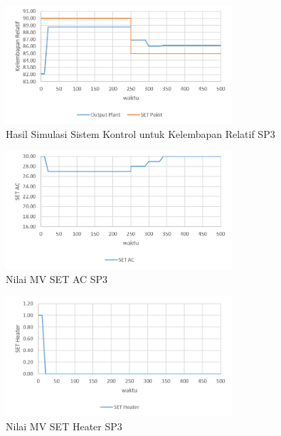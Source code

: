 \begin{figure}[!h]
	\centering
	\includegraphics[width=0.75\textwidth]{figures/SimulinkSP3RH}
	\caption{Hasil Simulasi Sistem Kontrol untuk Kelembapan Relatif SP3}
	\label{fig:5:SimulinkSP3RH}
\end{figure}

\begin{figure}[!h]
	\centering
	\includegraphics[width=0.75\textwidth]{figures/SimulinkSP3AC}
	\caption{Nilai MV SET AC SP3}
	\label{fig:5:SimulinkSP3AC}
\end{figure}

\begin{figure}[!h]
	\centering
	\includegraphics[width=0.75\textwidth]{figures/SimulinkSP3HT}
	\caption{Nilai MV SET Heater SP3}
	\label{fig:5:SimulinkSP3HT}
\end{figure}
